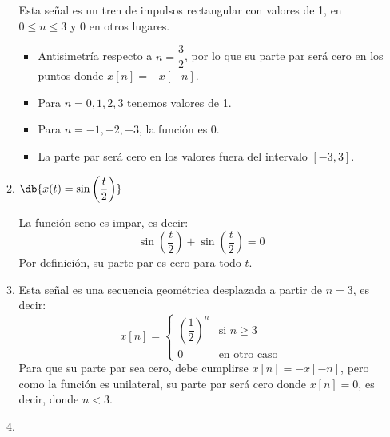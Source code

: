 \begin{enumerate}[label=\color{red}\textbf{\arabic*)}]
\begin{enumerate}[label=\color{red}\textbf{\alph*)}]
        Esta señal es un tren de impulsos rectangular con valores de 1, en $0\le n\le 3$ y 0 en otros lugares.
        \begin{itemize}[label=\textbullet]
          \item Antisimetría respecto a $n=\dfrac{3}{2}$, por lo que su parte par será cero en los puntos donde $x[n]=-x[-n]$.
          \item Para $n=0,1,2,3$ tenemos valores de 1.
          \item Para  $n=-1,-2,-3$, la función es 0.
          \item La parte par será cero en los valores fuera del intervalo  $[-3,3]$.
        \end{itemize}
      \item $\db{x(t)=\sin\left( \dfrac{t}{2} \right) } $ 

        La función seno es impar, es decir: \[
        \sin\left( \dfrac{t}{2} \right) +\sin\left( \dfrac{t}{2} \right) =0
        \] 
        Por definición, su parte par es cero para todo $t$.
      \item {}

        Esta señal es una secuencia geométrica desplazada a partir de $n=3$, es decir:  \[
          x[n]=\begin{cases}
            \left( \dfrac{1}{2} \right) ^{n} & \text{si }n\ge 3\\
            0 & \text{en otro caso}
          \end{cases}
        \] 
        Para que su parte par sea cero, debe cumplirse $x[n]=-x[-n]$, pero como la función es unilateral, su parte par será cero donde  $x[n]=0$, es decir, donde  $n<3$.
      \item {} 


\end{enumerate}
\end{enumerate}
